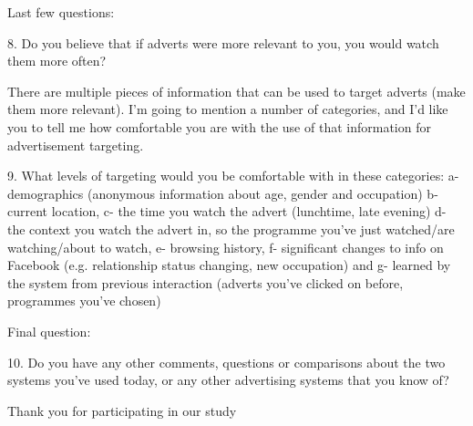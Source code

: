 	Last few questions:

	8. Do you believe that if adverts were more relevant to you, you would watch them more often?

	There are multiple pieces of information that can be used to target adverts (make them more relevant). I’m going to mention a number of categories, and I’d like you to tell me how comfortable you are with the use of that information for advertisement targeting.

	9. What levels of targeting would you be comfortable with in these categories: 
	a- demographics (anonymous information about age, gender and occupation)
	b- current location, 
	c- the time you watch the advert (lunchtime, late evening)
	d- the context you watch the advert in, so the programme you’ve just watched/are watching/about to watch, 
	e- browsing history, 
	f- significant changes to info on Facebook (e.g. relationship status changing, new occupation) 
	and 
	g- learned by the system from previous interaction (adverts you’ve clicked on before, programmes you’ve chosen)

	Final question:

	10. Do you have any other comments, questions or comparisons about the two systems you’ve used today, or any other advertising systems that you know of?

	Thank you for participating in our study
